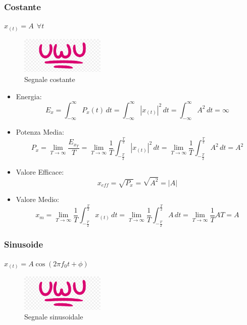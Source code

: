        \subsubsection{Costante}
            $x_{(t)} = A\ \ \forall t$
            \begin{figure}[h]
                \centering
                \includegraphics[width=4cm]{media/uwu.png}
                \caption{Segnale costante}
                \label{fig:segnale costante}
            \end{figure}
            \begin{itemize}
                \item {Energia:
                        \[
                            E_{x} = \int_{-\infty}^{\infty} P_{x}(t) \,dt = \int_{-\infty}^{\infty} |x_{(t)}|^2 \,dt = \int_{-\infty}^{\infty} A^2 \,dt = \infty 
                        \]
                }
                \item {Potenza Media:
                        \[
                            P_{x} = \lim_{T\rightarrow\infty} \frac{E_{x_{T}}}{T} = \lim_{T\rightarrow\infty} \frac{1}{T} \int_{-\frac{T}{2}}^{\frac{T}{2}}  |x_{(t)}|^2 \,dt = \lim_{T\rightarrow\infty} \frac{1}{T} \int_{-\frac{T}{2}}^{\frac{T}{2}} A^2 \,dt = A^2     
                        \]
                }
                \item {Valore Efficace:
                        \[
                            x_{eff} = \sqrt{P_{x}} = \sqrt{A^2} = |A|
                        \]
                }
                \item {Valore Medio:
                        \[
                            x_{m} = \lim_{T\rightarrow\infty} \frac{1}{T} \int_{-\frac{T}{2}}^{\frac{T}{2}}  x_{(t)} \,dt = \lim_{T\rightarrow\infty} \frac{1}{T} \int_{-\frac{T}{2}}^{\frac{T}{2}}  A \,dt = \lim_{T\rightarrow\infty} \frac{1}{T} AT = A 
                        \]
                }
            \end{itemize}
        \subsubsection{Sinusoide}
            $x_{(t)} = A \cos(2 \pi f_0 t +\phi)$
            \begin{figure}[H]
                \centering
                \includegraphics[width=4cm]{media/uwu.png}
                \caption{Segnale sinusoidale}
                \label{fig:segnale sinusoidale}
            \end{figure}
